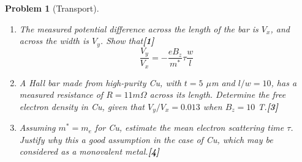 \documentclass[a4paper]{article}
\theoremstyle{new}
\newtheorem{qns}{Problem}[subsection]
\begin{document}
\begin{qns}[Transport]
\begin{enumerate}[label=(\roman*)]
\item The measured potential difference across the length of the bar is $V_x$, and across the width is $V_y$. Show that\hfill\textbf{[1]} 
$$\frac{V_y}{V_x}=-\frac{eB_z}{m^*}\tau\frac{w}{l}$$
\item A Hall bar made from high-purity Cu, with $t = 5$ $\mu$m and $l/w = 10$, has a measured resistance of $R = 11m\Omega$ across its length. Determine the free electron density in Cu, given that $V_y/V_x=0.013$ when $B_z = 10$ T.\hfill\textbf{[3]}
\item Assuming $m^*=m_e$ for Cu, estimate the mean electron scattering time $\tau$. Justify why this a good assumption in the case of Cu, which may be considered as a monovalent metal.\hfill\textbf{[4]}
\end{enumerate}
\end{qns}
\newpage
\end{document}
